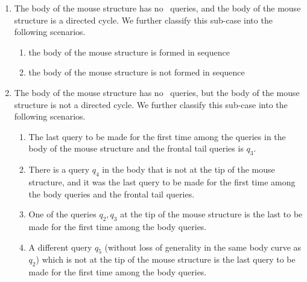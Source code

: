 \begin{enumerate}
\begin{enumerate}
\begin{enumerate}
  \item \label{case:norepc} The body of the mouse structure has no \new\ queries, and the body of the mouse structure is a directed cycle.
  We further classify this sub-case into the following scenarios.
  \begin{enumerate}
      \item the body of the mouse structure is formed in sequence
      \item the body of the mouse structure is not formed in sequence
  \end{enumerate}
  \item \label{case:norepd} The body of the mouse structure has no \new\ queries, but the body of the mouse structure is not a directed cycle. We further classify this sub-case into the following scenarios.
  \begin{enumerate}
      \item The last query to be made for the first time among the queries in the body of the mouse structure and the frontal tail queries is $q_3$.
      \item There is a query $q_4$ in the body that is not at the tip of the mouse structure, and it was the last query to be made for the first time among the body queries and the frontal tail queries. 
      \item One of the queries $q_2,q_3$ at the tip of the mouse structure is the last to be made for the first time among the body queries.
      \item A different query $q_5$ (without loss of generality in the same body curve as $q_2$) which is not at the tip of the mouse structure is the last query to be made for the first time among the body queries.
  \end{enumerate}
    \end{enumerate}
\end{enumerate}

\end{enumerate}


